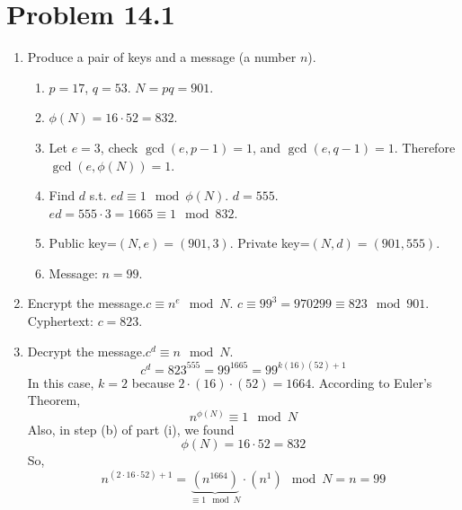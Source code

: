 \documentclass[12pt]{article}
\title{\scalebox{1.75}{Math 341 Final Project}}
\author{\scalebox{1.5}{Theo Koss}}
\date{December 2020}
\begin{document}
\maketitle
\section{Problem 14.1}
\begin{enumerate}[label=(\roman*)]
    \item Produce a pair of keys and a message (a number $n$).
    \begin{enumerate}[label=(\alph*)]
        \item $p=17$, $q=53$. $N=pq=901$.
        \item $\phi(N)=16\cdot52=832$.
        \item Let $e=3$, check $\gcd(e,p-1)=1$, and $\gcd(e,q-1)=1$. Therefore $\gcd(e,\phi(N))=1$.
        \item Find $d$ s.t. $ed\equiv1\mod{\phi(N)}$. $d=555$.\newline $ed=555\cdot3=1665\equiv1\mod{832}$.
        \item Public key=$(N,e)=(901,3)$. \newline Private key=$(N,d)=(901,555)$.
        \item Message: $n=99$.
    \end{enumerate}
    \item Encrypt the message.\newline $c\equiv n^e\mod{N}$. \newline $c\equiv 99^3=970299\equiv823\mod{901}$. Cyphertext: $c=823$.
    \item Decrypt the message.\newline $c^d\equiv n\mod{N}$. $$c^d=823^{555}=99^{1665}=99^{k(16)(52)+1}$$ In this case, $k=2$ because $2\cdot(16)\cdot(52)=1664$. According to Euler's Theorem, $$n^{\phi(N)}\equiv1\mod{N}$$ Also, in step (b) of part (i), we found $$\phi(N)=16\cdot52=832$$ So, $$n^{(2\cdot16\cdot52)+1}=\underbrace{(n^{1664})}_{\equiv1\mod{N}}\cdot(n^1)\mod{N}=n=99$$
\end{enumerate}
\end{document}
